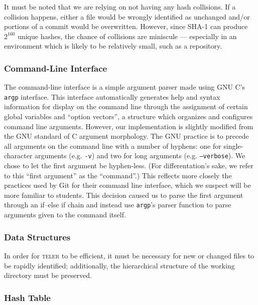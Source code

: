 \documentclass[11pt, letterpaper]{article}
\begin{document}
\begin{multicols}{2}
  It must be noted that we are relying on not having any
  hash collisions. If a collision happens, either a file would be
  wrongly identified as unchanged and/or portions of a commit would be
  overwritten. However, since SHA-1 can produce $2^{160}$ unique
  hashes, the chance of collisions are miniscule --- especially in an
  environment which is likely to be relatively small, such as a
  repository.

  \subsubsection{Command-Line Interface}
  \label{subsec:cli}

  The command-line interface is a simple argument parser made using
  GNU C's \texttt{argp} interface. This interface automatically
  generates help and syntax information for display on the command
  line through the assignment of certain global variables and ``option
  vectors'', a structure which organizes and configures command line
  arguments. However, our implementation is slightly modified from the
  GNU standard of C argument morphology. The GNU practice is to
  precede all arguments on the command line with a number of hyphens:
  one for single-character arguments (e.g. \texttt{-v}) and two for
  long arguments (e.g. \texttt{--verbose}). We chose to let the first
  argument be hyphen-less. (For differentation's sake, we refer to
  this ``first argument'' as the ``command''.) This reflects more
  closely the practices used by Git for their command line interface,
  which we suspect will be more familiar to students. This decision
  caused us to parse the first argument through an if--else if chain
  and instead use \texttt{argp}'s parser function to parse arguments
  given to the command itself.

  \subsubsection{Data Structures}
  \label{subsec:datastructures}
  In order for \textsc{teler} to be efficient, it must be necessary for
  new or changed files to be rapidly identified; additionally,
  the hierarchical structure of the working directory must be preserved.

  \subsubsection{Hash Table}
  \label{subsubsec:hashtable}


\end{multicols}
\end{document}
